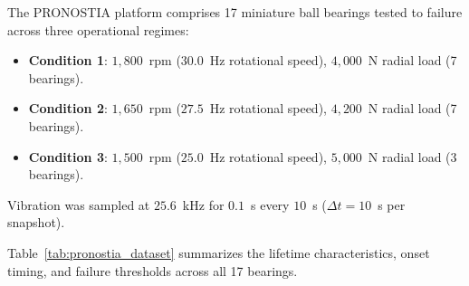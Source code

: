 \documentclass[11pt,a4paper]{article}
\begin{document}
The PRONOSTIA platform comprises 17 miniature ball bearings tested to failure across three operational regimes:
\begin{itemize}[leftmargin=2.2em]
    \item \textbf{Condition 1}: $1{,}800$~rpm ($30.0$~Hz rotational speed), $4{,}000$~N radial load (7 bearings).
    \item \textbf{Condition 2}: $1{,}650$~rpm ($27.5$~Hz rotational speed), $4{,}200$~N radial load (7 bearings).
    \item \textbf{Condition 3}: $1{,}500$~rpm ($25.0$~Hz rotational speed), $5{,}000$~N radial load (3 bearings).
\end{itemize}
Vibration was sampled at $25.6$~kHz for $0.1$~s every $10$~s ($\Delta t = 10$~s per snapshot).

Table~\ref{tab:pronostia_dataset} summarizes the lifetime characteristics, onset timing, and failure thresholds across all 17 bearings.
\end{document}
